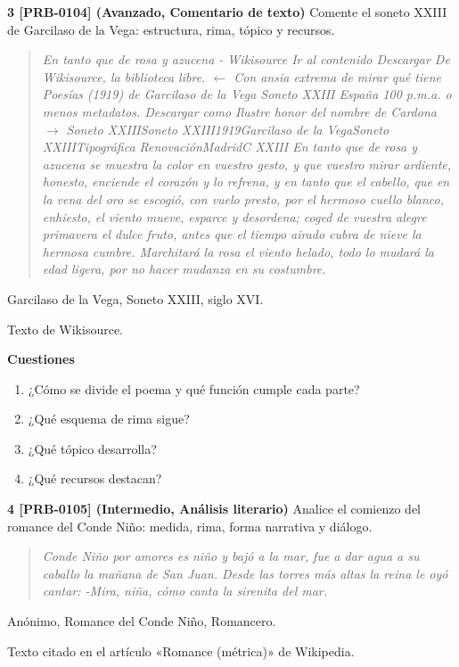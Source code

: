 \documentclass{book}
\begin{document}
\begin{tcolorbox}[title={Ejercicios}, studiumworked, breakable]
\noindent\textbf{3 [PRB-0104] (Avanzado, Comentario de texto)}
Comente el soneto XXIII de Garcilaso de la Vega: estructura, rima, tópico y recursos.


\begin{quote}
\itshape En tanto que de rosa y azucena - Wikisource Ir al contenido Descargar De Wikisource, la biblioteca libre. \(\leftarrow\) Con ansia extrema de mirar qué tiene Poesías (1919) de Garcilaso de la Vega Soneto XXIII España 100 p.m.a. o menos metadatos. Descargar como Ilustre honor del nombre de Cardona \(\to\) Soneto XXIIISoneto XXIII1919Garcilaso de la VegaSoneto XXIIITipográfica RenovaciónMadridC XXIII En tanto que de rosa y azucena se muestra la color en vuestro gesto, y que vuestro mirar ardiente, honesto, enciende el corazón y lo refrena, y en tanto que el cabello, que en la vena del oro se escogió, con vuelo presto, por el hermoso cuello blanco, enhiesto, el viento mueve, esparce y desordena; coged de vuestra alegre primavera el dulce fruto, antes que el tiempo airado cubra de nieve la hermosa cumbre. Marchitará la rosa el viento helado, todo lo mudará la edad ligera, por no hacer mudanza en su costumbre.
\end{quote}
{\noindent\footnotesize Garcilaso de la Vega, Soneto XXIII, siglo XVI.\par}
{\noindent\footnotesize Texto de Wikisource.\par}

\noindent\textbf{Cuestiones}
\begin{enumerate}
\item ¿Cómo se divide el poema y qué función cumple cada parte?
\item ¿Qué esquema de rima sigue?
\item ¿Qué tópico desarrolla?
\item ¿Qué recursos destacan?
\end{enumerate}

\noindent\textbf{4 [PRB-0105] (Intermedio, Análisis literario)}
Analice el comienzo del romance del Conde Niño: medida, rima, forma narrativa y diálogo.


\begin{quote}
\itshape Conde Niño por amores es niño y bajó a la mar, fue a dar agua a su caballo la mañana de San Juan. Desde las torres más altas la reina le oyó cantar: -Mira, niña, cómo canta la sirenita del mar.
\end{quote}
{\noindent\footnotesize Anónimo, Romance del Conde Niño, Romancero.\par}
{\noindent\footnotesize Texto citado en el artículo «Romance (métrica)» de Wikipedia.\par}


\end{tcolorbox}
\end{document}
